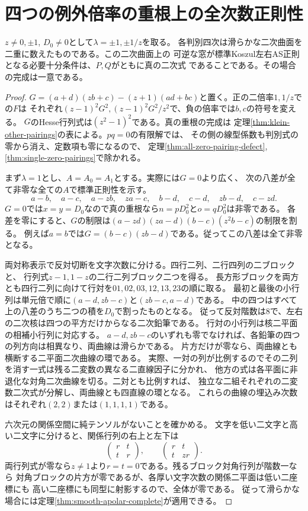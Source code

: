 \section{四つの例外倍率の重根上の全次数正則性}
\label{sec:exceptional-ramification}
\begin{theorem}\label{thm:exceptional-ramification-as}
$z\ne0,\pm1$, $D_0\ne0$として$\lambda=\pm1,\pm1/z$を取る。
各判別四次は滑らかな二次曲面を二重に数えたものである。この二次曲面上の
可逆な窓が標準Koszul左右AS正則となる必要十分条件は、$P,Q$がともに真の二次式
であることである。その場合の完成は一意である。
\end{theorem}
\begin{proof}
$G=(a+d)(zb+c)-(z+1)(ad+bc)$と置く。正の二倍率$1,1/z$での$F$は
それぞれ$(z-1)^2G^2,(z-1)^2G^2/z^2$で、負の倍率では$b,c$の符号を変える。
$G$のHesse行列式は$(z^2-1)^2$である。真の重根の完成は
定理\ref{thm:klein-other-pairings}の表による。$pq=0$の有限解では、
その側の線型係数も判別式の零から消え、定数項も零になるので、
定理\ref{thm:all-zero-pairing-defect}, \ref{thm:single-zero-pairings}で除かれる。

まず$\lambda=1$とし、$A=A_0=A_1$とする。実際には$G=0$より広く、
次の八差が全て非零な全ての$A$で標準正則性を示す。
\[
 a-b,\quad a-c,\quad a-zb,\quad za-c,\quad
 b-d,\quad c-d,\quad zb-d,\quad c-zd .
\]
$G=0$では$x=y=D_0$なので真の重根なら$n=pD_0^2$と$o=qD_0^2$は非零である。
各差を零にすると、$G$の制限は$(a-zd)(za-d)(b-c)(z^2b-c)$の制限を割る。
例えば$a=b$では$G=(b-c)(zb-d)$である。従ってこの八差は全て非零となる。

両対称表示で反対切断を文字次数に分ける。四行二列、二行四列の二ブロックと、
行列式$z-1,1-z$の二行二列ブロック二つを得る。
長方形ブロックを両方とも四行二列に向けて行対を$01,02,03,12,13,23$の順に取る。
最初と最後の小行列は単元倍で順に$(a-d,zb-c)$と$(zb-c,a-d)$である。
中の四つはすべて上の八差のうち二つの積を$D_0$で割ったものとなる。
従って反対階数は8で、左右の二次核は四つの平方だけからなる二次鉛筆である。
行対の小行列は核二平面の相補小行列に対応する。
$a-d,zb-c$のいずれも零でなければ、各鉛筆の四つの列方向は相異なり、両曲線は滑らかである。
片方だけが零なら、両曲線とも横断する二平面二次曲線の環である。
実際、一対の列が比例するのでその二列を消す一式は残る二変数の異なる二直線因子に分かれ、
他方の式は各平面に非退化な対角二次曲線を切る。二対とも比例すれば、
独立な二組それぞれの二変数二次式が分解し、両曲線とも四直線の環となる。
これらの曲線の埋込み次数はそれぞれ$(2,2)$または$(1,1,1,1)$である。

六次元の関係空間に純テンソルがないことを確かめる。
文字を低い二文字と高い二文字に分けると、関係行列の右上と左下は
\[
 \begin{pmatrix}r&t\\t&r\end{pmatrix},\qquad
 \begin{pmatrix}r&t\\t&zr\end{pmatrix}.
\]
両行列式が零なら$z\ne1$より$r=t=0$である。残るブロック対角行列が階数一なら
対角ブロックの片方が零であるが、各厚い文字次数の関係二平面は低い二座標にも
高い二座標にも同型に射影するので、全体が零である。
従って滑らかな場合には定理\ref{thm:smooth-apolar-complete}が適用できる。


\end{proof}
